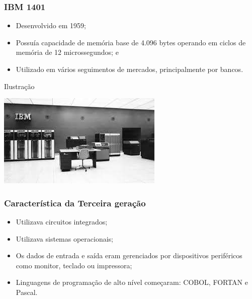 \documentclass[aspectratio=169]{beamer} %
\begin{document}
\begin{frame}
	\frametitle{IBM 1401}
	
	\begin{itemize}
		\item Desenvolvido em 1959; 
		\item Possuía capacidade de memória base de 4.096 bytes operando em ciclos de memória de 12 microssegundos; e
		\item Utilizado em vários seguimentos de mercados, principalmente por bancos.
	\end{itemize}\vfill
	
	\begin{exampleblock}{Ilustra\c cão}
		\begin{center}
			\includegraphics[scale=0.5]{img/ibm1401}
		\end{center}
	\end{exampleblock}
\end{frame}

\begin{frame}
	\frametitle{Característica da Terceira gera\c cão}

	\begin{itemize}
		\item Utilizava circuitos integrados;
		\item Utilizava sistemas operacionais;
		\item Os dados de entrada e saída eram gerenciados por dispositivos periféricos como monitor, teclado ou impressora;
		\item Linguagens de programação de alto nível começaram: COBOL, FORTAN e Pascal.
	\end{itemize}	
\end{frame}
\end{document}
